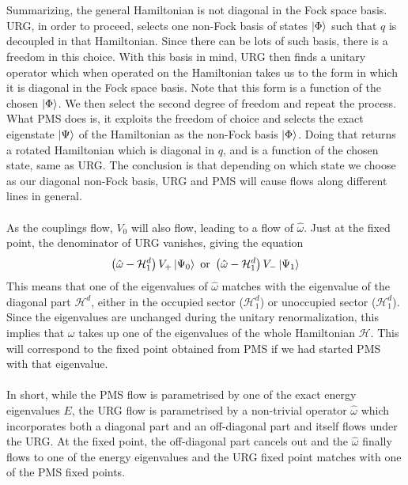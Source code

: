 \documentclass[twoside]{report}
\numberwithin{equation}{section}
\begin{document}
\\\\Summarizing, the general Hamiltonian is not diagonal in the Fock space basis.
URG, in order to proceed, selects one non-Fock basis of states \(\ket{\Phi}\) such that \(q\) is decoupled in that Hamiltonian.
Since there can be lots of such basis, there is a freedom in this choice.
With this basis in mind, URG then finds a unitary operator which when operated on the Hamiltonian takes us to the form in which it is diagonal in the Fock space basis.
Note that this form is a function of the chosen \(\ket{\Phi}\).
We then select the second degree of freedom and repeat the process.
What PMS does is, it exploits the freedom of choice and selects the exact eigenstate \(\ket{\Psi}\) of the Hamiltonian as the non-Fock basis \(\ket{\Phi}\).
Doing that returns a rotated Hamiltonian which is diagonal in \(q\), and is a function of the chosen state, same as URG. The conclusion is that depending on which state we choose as our diagonal non-Fock basis, URG and PMS will cause flows along different lines in general.
\\\\As the couplings flow, \(V_0\) will also flow, leading to a flow of \(\hat\omega\). Just at the fixed point, the denominator of URG vanishes, giving the equation
\begin{equation}\begin{aligned}
	\left(\hat\omega - \mathcal{H}_1^d\right)V_+\ket{\Psi_0} \text{ or } \left(\hat\omega - \mathcal{H}_1^d\right)V_-\ket{\Psi_1}
\end{aligned}\end{equation}
This means that one of the eigenvalues of \(\hat\omega\) matches with the eigenvalue of the diagonal part \(\mathcal{H}^d\), either in the occupied sector (\(\mathcal{H}^d_1\)) or unoccupied sector (\(\mathcal{H}^d_1\)). Since the eigenvalues are unchanged during the unitary renormalization, this implies that \(\omega\) takes up one of the eigenvalues of the whole Hamiltonian \(\mathcal{H}\). This will correspond to the fixed point obtained from PMS if we had started PMS with that eigenvalue.
\\\\In short, while the PMS flow is parametrised by one of the exact energy eigenvalues \(E\), the URG flow is parametrised by a non-trivial operator \(\hat \omega\) which incorporates both a diagonal part and an off-diagonal part and itself flows under the URG. At the fixed point, the off-diagonal part cancels out and the \(\hat\omega\) finally flows to one of the energy eigenvalues and the URG fixed point matches with one of the PMS fixed points.
\end{document}
